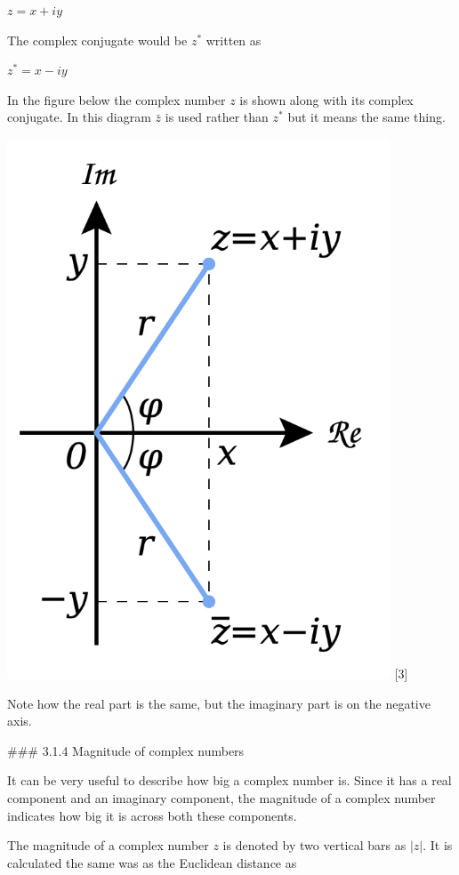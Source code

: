 \documentclass{book}
\begin{document}
$z = x + iy$ 

The complex conjugate would be $z^*$ written as 

$z^* = x - iy$ 

In the figure below the complex number $z$ is shown along with its complex conjugate. In this diagram $\bar{z}$ is used rather than $z^*$ but it means the same thing.  

\includegraphics{images/Complex_conjugate_picture.svg.png}
 [3]

 Note how the real part is the same, but the imaginary part is on the negative axis. 

 ### 3.1.4 Magnitude of complex numbers 

 It can be very useful to describe how big a complex number is. Since it has a real component and an imaginary component, the magnitude of a complex number indicates how big it is across both these components. 

 The magnitude of a complex number $z$ is denoted by two vertical bars as $|z|$. It is calculated the same was as the Euclidean distance as 
\end{document}
